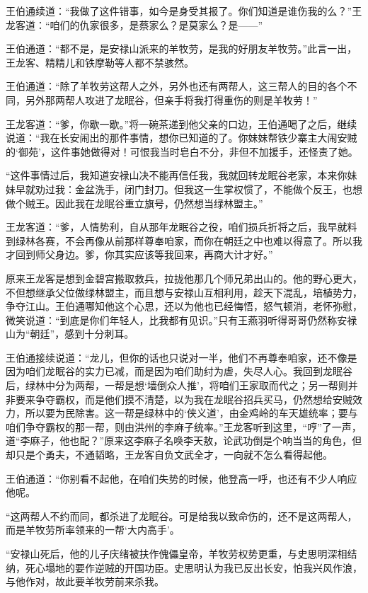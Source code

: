 \documentclass[12pt,oneside]{book}
\begin{document}
王伯通续道：``我做了这件错事，如今是身受其报了。你们知道是谁伤我的么？''王龙客道：``咱们的仇家很多，是蔡家么？是莫家么？是------''

王伯通道：``都不是，是安禄山派来的羊牧劳，是我的好朋友羊牧劳。''此言一出，王龙客、精精儿和铁摩勒等人都不禁骇然。

王伯通道：``除了羊牧劳这帮人之外，另外也还有两帮人，这三帮人的目的各个不同，另外那两帮人攻进了龙眠谷，但亲手将我打得重伤的则是羊牧劳！''

王龙客道：``爹，你歇一歇。''将一碗茶递到他父亲的口边，王伯通喝了之后，继续说道：``我在长安闹出的那件事情，想你已知道的了。你妹妹帮铁少寨主大闹安贼的`御苑'，这件事她做得对！可恨我当时皂白不分，非但不加援手，还怪责了她。

``这件事情过后，我知道安禄山决不能再信任我，我就回转龙眠谷老家，本来你妹妹早就劝过我：金盆洗手，闭门封刀。但我这一生掌权惯了，不能做个反王，也想做个贼王。因此我在龙眠谷重立旗号，仍然想当绿林盟主。''

王龙客道：``爹，人情势利，自从那年龙眠谷之役，咱们损兵折将之后，我早就料到绿林各赛，不会再像从前那样尊奉咱家，而你在朝廷之中也难以得意了。所以我才回到师父身边。爹，你其实应该等我回来，再商大计才好。''

原来王龙客是想到金碧宫搬取救兵，拉拢他那几个师兄弟出山的。他的野心更大，不但想继承父位做绿林盟主，而且想与安禄山互相利用，趁天下混乱，培植势力，争夺江山。王伯通哪知他这个心思，还以为他也已经悔悟，怒气顿消，老怀弥慰，微笑说道：``到底是你们年轻人，比我都有见识。''只有王燕羽听得哥哥仍然称安禄山为``朝廷''，感到十分刺耳。

王伯通接续说道：``龙儿，但你的话也只说对一半，他们不再尊奉咱家，还不像是因为咱们龙眠谷的实力已减，而是因为咱们助纣为虐，失尽人心。我回到龙眠谷后，绿林中分为两帮，一帮是想`墙倒众人推'，将咱们王家取而代之；另一帮则并非要来争夺霸权，而是他们摸不清楚，以为我在龙眠谷招兵买马，仍然想给安贼效力，所以要为民除害。这一帮是绿林中的`侠义道'，由金鸡岭的车天雄统率；要与咱们争夺霸权的那一帮，则由洪州的李麻子统率。''王龙客听到这里，``哼''了一声，道``李麻子，他也配？''原来这李麻子名唤李天敖，论武功倒是个响当当的角色，但却只是个勇夫，不通韬略，王龙客自负文武全才，一向就不怎么看得起他。

王伯通道：``你别看不起他，在咱们失势的时候，他登高一呼，也还有不少人响应他呢。

``这两帮人不约而同，都杀进了龙眠谷。可是给我以致命伤的，还不是这两帮人，而是羊牧劳所率领来的一帮`大内高手'。

``安禄山死后，他的儿子庆绪被扶作傀儡皇帝，羊牧劳权势更重，与史思明深相结纳，死心塌地的要作逆贼的开国功臣。史思明认为我已反出长安，怕我兴风作浪，与他作对，故此要羊牧劳前来杀我。
\end{document}

